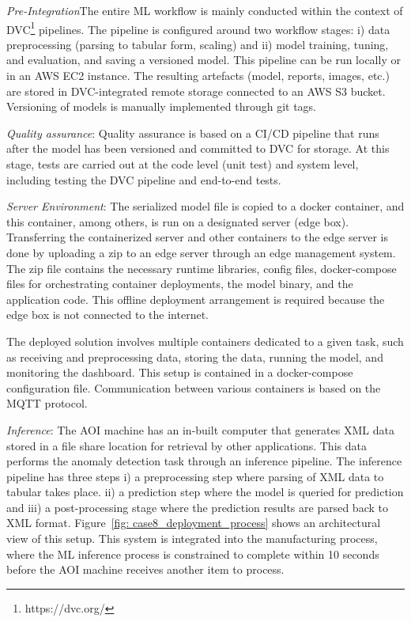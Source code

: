 
\textit{Pre-Integration}The entire ML workflow is mainly conducted within the context of DVC\footnote{https://dvc.org/} pipelines. The pipeline is configured around two workflow stages: i) data preprocessing (parsing to tabular form, scaling) and ii) model training, tuning, and evaluation, and saving a versioned model. This pipeline can be run locally or in an AWS EC2 instance. The resulting artefacts (model, reports, images, etc.) are stored in DVC-integrated remote storage connected to an AWS S3 bucket. Versioning of models is manually implemented through git tags.

\textit{Quality assurance}: Quality assurance is based on a CI/CD pipeline that runs after the model has been versioned and committed to DVC for storage. At this stage, tests are carried out at the code level (unit test) and system level, including testing the DVC pipeline and end-to-end tests.

\textit{Server Environment}: The serialized model file is copied to a docker container, and this container, among others, is run on a designated server (edge box). Transferring the containerized server and other containers to the edge server is done by uploading a zip to an edge server through an edge management system. The zip file contains the necessary runtime libraries, config files, docker-compose files for orchestrating container deployments, the model binary, and the application code. This offline deployment arrangement is required because the edge box is not connected to the internet.

The deployed solution involves multiple containers dedicated to a given task, such as receiving and preprocessing data, storing the data, running the model, and monitoring the dashboard. This setup is contained in a docker-compose configuration file. Communication between various containers is based on the MQTT protocol. 

\textit{Inference}: The AOI machine has an in-built computer that generates XML data stored in a file share location for retrieval by other applications. This data performs the anomaly detection task through an inference pipeline. The inference pipeline has three steps i) a preprocessing step where parsing of XML data to tabular takes place. ii) a prediction step where the model is queried for prediction and iii) a post-processing stage where the prediction results are parsed back to XML format. Figure~\ref{fig: case8_deployment_process} shows an architectural view of this setup. This system is integrated into the manufacturing process, where the ML inference process is constrained to complete within 10 seconds before the AOI machine receives another item to process.

